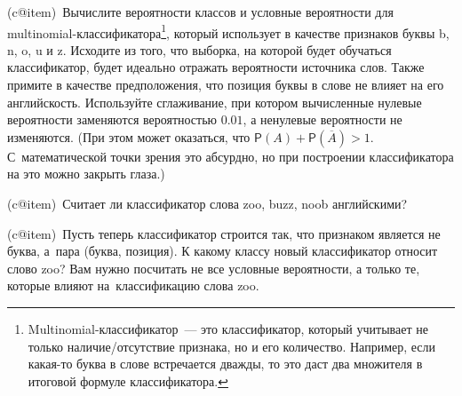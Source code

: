 \documentclass[12pt,a4paper]{article}
\makeatletter
\newcommand*{\ralph}[1]{\expandafter\rralph\csname c@#1\endcsname}
\newcommand*{\rralph}[1]%
{\ifcase #1\or а\or б\or в\or г\or д\or е\or ж\or з\or и\or
к\or л\or м\or н\or о\or п\or р\or с\or т\or у\or
ф\or х\or ц\or ч\or ш\or щ\or э\or ю\or
я\fi}
\newcounter{item}
\newcommand*{\ite}{\par\addtocounter{item}{1}(\ralph{item})\ }
\newcommand{\myP}[0]{\mathsf{P}}
\makeatother
\begin{document}
\ite Вычислите вероятности классов и условные вероятности для multinomial-\linebreak классификатора\footnote[1]{Multinomial-классификатор~--- это классификатор, который учитывает не только наличие/отсутствие признака, но и его количество. Например, если какая-то буква в слове встречается дважды, то это даст два множителя в итоговой формуле классификатора.}, который использует в качестве признаков буквы b, n, o, u и z. Исходите из того, что выборка, на которой будет обучаться классификатор, будет идеально отражать вероятности источника слов. Также примите в качестве предположения, что позиция буквы в слове не влияет на его английскость. Используйте сглаживание, при котором вычисленные нулевые вероятности заменяются вероятностью $0.01$, а ненулевые вероятности не изменяются. (При этом может оказаться, что $\myP(A) + \myP(\overline A) > 1$. С~математической точки зрения это абсурдно, но при построении классификатора на это можно закрыть глаза.)

\ite Считает ли классификатор слова \textsf{zoo}, \textsf{buzz}, \textsf{noob} английскими?

\ite Пусть теперь классификатор строится так, что признаком является не буква, а~пара (буква, позиция). К какому классу новый классификатор относит слово \textsf{zoo}? Вам нужно посчитать не все условные вероятности, а только те, которые влияют на~классификацию слова \textsf{zoo}.
\end{document}
